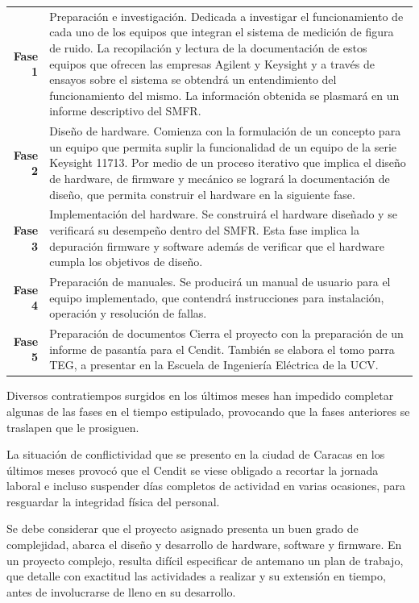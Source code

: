 \documentclass[paper=letter,oneside,fontsize=12pt, parskip=full]{article}
\begin{document}
	\begin{table}[!h]
		\begin{tabular}{rp{13cm}}
			\textbf{Fase 1} & Preparación e investigación. Dedicada a investigar el funcionamiento de cada uno de los equipos que integran el sistema de medición de figura de ruido. La recopilación y lectura de la documentación de estos equipos que ofrecen las empresas Agilent y Keysight y a través de ensayos sobre el sistema se obtendrá un entendimiento del funcionamiento del mismo. La información obtenida se plasmará en un informe descriptivo del SMFR. \\			
			\textbf{Fase 2} & Diseño de hardware. Comienza con la formulación de un concepto para un equipo que permita suplir la funcionalidad de un equipo de la serie Keysight 11713. Por medio de un proceso iterativo que implica el diseño de hardware, de firmware y mecánico se logrará la documentación de diseño, que permita construir el hardware en la siguiente fase.	\\		
			\textbf{Fase 3} & Implementación del hardware. Se construirá el hardware diseñado y se verificará su desempeño dentro del SMFR. Esta fase implica la depuración firmware y software además de verificar que el hardware cumpla los objetivos de diseño. \\
			\textbf{Fase 4} & Preparación de manuales. Se producirá un manual de usuario para el equipo implementado, que contendrá instrucciones para instalación, operación y resolución de fallas. \\
			\textbf{Fase 5} & Preparación de documentos Cierra el proyecto con la preparación de un informe de pasantía para el Cendit. También se elabora el tomo parra TEG, a presentar en la Escuela de Ingeniería Eléctrica de la UCV.
		\end{tabular}
	\end{table}

	Diversos contratiempos surgidos en los últimos meses han impedido completar algunas de las fases en el tiempo estipulado, provocando que la fases anteriores se traslapen que le prosiguen.
	
	La situación de conflictividad que se presento en la ciudad de Caracas en los últimos meses provocó que el Cendit se viese obligado a recortar la jornada laboral e incluso suspender días completos de actividad en varias ocasiones, para resguardar la integridad física del personal.
	
	Se debe considerar que el proyecto asignado presenta un buen grado de complejidad, 
	abarca el diseño y desarrollo de hardware, software y firmware. En un proyecto complejo, resulta difícil especificar de antemano un plan de trabajo, que detalle con exactitud las actividades a realizar y su extensión en tiempo, antes de involucrarse de lleno en su desarrollo. 
	
\end{document}
